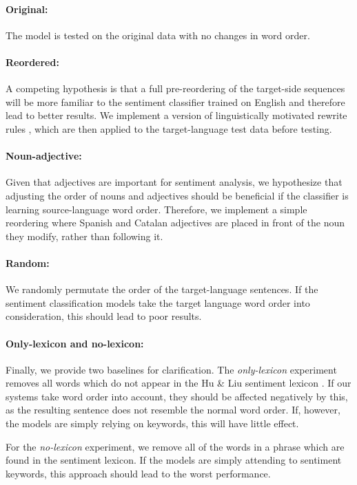 \documentclass[11pt,a4paper]{article}
\begin{document}
\paragraph{Original: }The model is tested on the original data with no changes in word order.

\paragraph{Reordered: }A competing hypothesis is that a full pre-reordering of the target-side sequences will be more familiar to the sentiment classifier trained on English and therefore lead to better results. We implement a version of linguistically motivated rewrite rules \cite{Crego2006,Crego2006b}, which are then applied to the target-language test data before testing.

\paragraph{Noun-adjective: }Given that adjectives are important for sentiment analysis, we hypothesize that adjusting the order of nouns and adjectives should be beneficial if the classifier is learning source-language word order. Therefore, we implement a simple reordering where Spanish and Catalan adjectives are placed in front of the noun they modify, rather than following it.

\paragraph{Random: }We randomly permutate the order of the target-language sentences. If the sentiment classification models take the target language word order into consideration, this should lead to poor results.

\paragraph{Only-lexicon and no-lexicon: }Finally, we provide two baselines for clarification. The \emph{only-lexicon} experiment removes all words which do
not appear in the Hu \& Liu sentiment lexicon \cite{HuandLiu2004}. If our systems
take word order into account, they should be affected negatively by this, as the
resulting sentence does not resemble the normal word order. If, however, the models
are simply relying on keywords, this will have little effect.

For the \emph{no-lexicon} experiment, we remove all of the words
in a phrase which are found in the sentiment lexicon. If the models are simply attending to
sentiment keywords, this approach should lead to the worst performance. 
\end{document}
